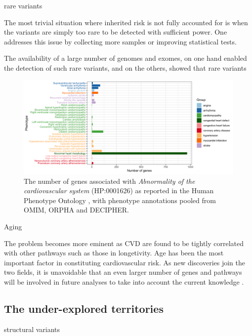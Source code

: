 \documentclass[letter]{bioinfo}
\begin{document}
rare variants

The most trivial situation where inherited risk is not fully accounted for is when the variants are simply too rare to be detected with sufficient power. One addresses this issue by collecting more samples or improving statistical tests.

The availability of a large number of genomes and exomes, on one hand enabled the detection of such rare variants, and on the others,  showed that rare variants 


\begin{figure}[!tpb]
	\includegraphics[width=1.\linewidth]{hpo-gene-count}
	\caption{The number of genes associated with \textit{Abnormality of the cardiovascular system} (HP:0001626) as reported in the Human Phenotype Ontology \citep{Kohler:2014:Human}, with phenotype annotations pooled from OMIM, ORPHA and DECIPHER.}
	\label{fig:hpo_gene_count}	
\end{figure}

Aging

The problem becomes more eminent as CVD are found to be tightly correlated with other pathways such as those in longetivity. Age has been the most important factor in constituting cardiovascular risk. As new discoveries join the two fields, it is unavoidable that an even larger number of genes and pathways will be involved in future analyses to take into account the current knowledge \citep{North:2012:Intersection}.

 
\subsection{The under-explored territories}


structural variants
\end{document}
